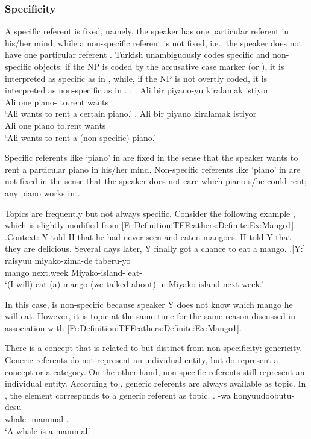 \subsubsection{Specificity}

A specific referent is fixed, namely, the speaker has one particular referent in his/her mind;
while a non-specific referent is not fixed,
i.e., the speaker does not have one particular referent \cite{karttunen69diss,enc91,abbott94}.
Turkish unambiguously codes specific and non-specific objects:
if the NP is coded by the accusative case marker  (or ),
it is interpreted as specific as in \Next[a],
while, if the NP is not overtly coded,
it is interpreted as non-specific as in \Next[b].
\ex. \ag. Ali bir piyano-yu kiralamak istiyor \\
	Ali one piano- to.rent wants \\
	`Ali wants to rent a certain piano.'
	\bg. Ali bir piyano kiralamak istiyor \\
	Ali one piano to.rent wants \\
	`Ali wants to rent a (non-specific) piano.'
	\hfill{\cite[][p.\ 4-5]{enc91}}

Specific referents like `piano' in \Last[a] are fixed
in the sense that
the speaker wants to rent a particular piano in his/her mind.
Non-specific referents like `piano' in \Last[b] are not fixed
in the sense that
the speaker does not care which piano s/he could rent;
any piano works in \Last[b].

Topics are frequently but not always specific.
Consider the following example \Next,
which is slightly modified from \ref{Fr:Definition:TFFeathers:Definite:Ex:Mango1}.
%
\ex.\label{Fr:Definition:TFFeathers:Specificity:Mango}Context:
	Y told H that he had never seen and eaten mangoes.
	H told Y that they are delicious.
	Several days later, Y finally got a chance to eat a mango.
	\ag.[Y:]  raisyuu miyako-zima-de taberu-yo \\
			mango next.week Miyako-island- eat- \\
			`(I will) eat (a) mango (we talked about) in Miyako island next week.'

In this case,  is non-specific because speaker Y does not know which mango he will eat.
However, it is topic at the same time for the same reason discussed in association with \ref{Fr:Definition:TFFeathers:Definite:Ex:Mango1}.

There is a concept that is related to but distinct from non-specificity: genericity.
Generic referents do not represent an individual entity,
but do represent a concept or a category.
On the other hand, non-specific referents still represent an individual entity.
According to ,
generic referents are always available as topic.
In \Next,
the element  corresponds to a generic referent as topic.
%
\exg. -wa honyuudoobutu-desu \\
		whale- mammal-. \\
		`A whale is a mammal.' \hfill{\cite[][p.\ 270]{kuno72}}

